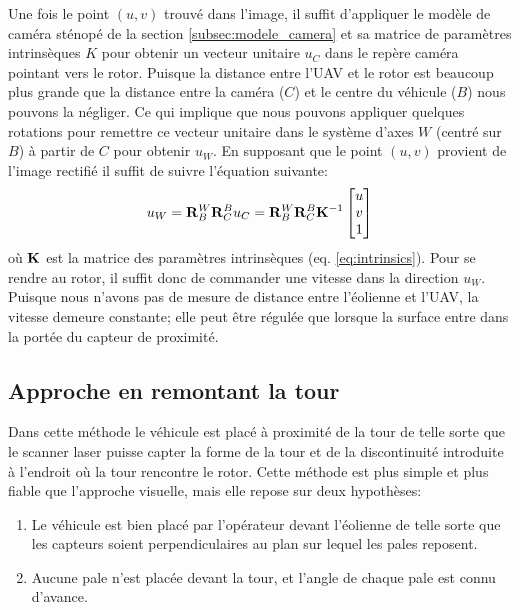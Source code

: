 Une fois le point $(u,v)$ trouvé dans l'image, il suffit d'appliquer le modèle de caméra sténopé de la section \ref{subsec:modele_camera} et sa matrice de paramètres intrinsèques $K$ pour obtenir un vecteur unitaire $u_C$ dans le repère caméra pointant vers le rotor. Puisque la distance entre l'UAV et le rotor est beaucoup plus grande que la distance entre la caméra ($C$) et le centre du véhicule ($B$) nous pouvons la négliger. Ce qui implique que nous pouvons appliquer quelques rotations pour remettre ce vecteur unitaire dans le système d'axes $W$ (centré sur $B$) à partir de $C$ pour obtenir $u_W$. En supposant que le point $(u,v)$ provient de l'image rectifié il suffit de suivre l'équation suivante:
\begin{align}
  u_W = \mathbf{R}^W_B \mathbf{R}^B_C u_C = \mathbf{R}^W_B \mathbf{R}^B_C \mathbf{K}^{-1} \begin{bmatrix}u \\ v \\ 1\end{bmatrix}
\end{align}
où $\mathbf{K}$ est la matrice des paramètres intrinsèques (eq. \ref{eq:intrinsics}). Pour se rendre au rotor, il suffit donc de commander une vitesse dans la direction $u_W$. Puisque nous n'avons pas de mesure de distance entre l'éolienne et l'UAV, la vitesse demeure constante; elle peut être régulée que lorsque la surface entre dans la portée du capteur de proximité.

\subsection{Approche en remontant la tour}
\label{subsec:laser_tower}

Dans cette méthode le véhicule est placé à proximité de la tour de telle sorte que le scanner laser puisse capter la forme de la tour et de la discontinuité introduite à l'endroit où la tour rencontre le rotor. Cette méthode est plus simple et plus fiable que l'approche visuelle, mais elle repose sur deux hypothèses:
\begin{enumerate}
  \item Le véhicule est bien placé par l'opérateur devant l'éolienne de telle sorte que les capteurs soient perpendiculaires au plan sur lequel les pales reposent.
  \item Aucune pale n'est placée devant la tour, et l'angle de chaque pale est connu d'avance.
\end{enumerate}


